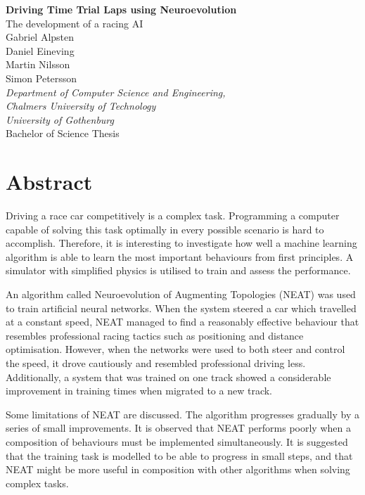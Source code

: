 \thispagestyle{plain}			%

\noindent
{\large \textbf{Driving Time Trial Laps using Neuroevolution}}\\
{\large The development of a racing AI}\\

\noindent
{\large Gabriel Alpsten}\\
{\large Daniel Eineving}\\
{\large Martin Nilsson}\\
{\large Simon Petersson}\\
\textit{Department of Computer Science and Engineering,}\\
\textit{Chalmers University of Technology}\\
\textit{University of Gothenburg}\\

\noindent
Bachelor of Science Thesis

\section*{\centering Abstract}

Driving a race car competitively is a complex task. Programming a computer capable of solving this task optimally in every possible scenario is hard to accomplish. Therefore, it is interesting to investigate how well a machine learning algorithm is able to learn the most important behaviours from first principles. A simulator with simplified physics is utilised to train and assess the performance.

An algorithm called Neuroevolution of Augmenting Topologies (NEAT) was used to train artificial neural networks. When the system steered a car which travelled at a constant speed, NEAT managed to find a reasonably effective behaviour that resembles professional racing tactics such as positioning and distance optimisation. However, when the networks were used to both steer and control the speed, it drove cautiously and resembled professional driving less. Additionally, a system that was trained on one track showed a considerable improvement in training times when migrated to a new track. 

Some limitations of NEAT are discussed. The algorithm progresses gradually by a series of small improvements. It is observed that NEAT performs poorly when a composition of behaviours must be implemented simultaneously. It is suggested that the training task is modelled to be able to progress in small steps, and that NEAT might be more useful in composition with other algorithms when solving complex tasks.



